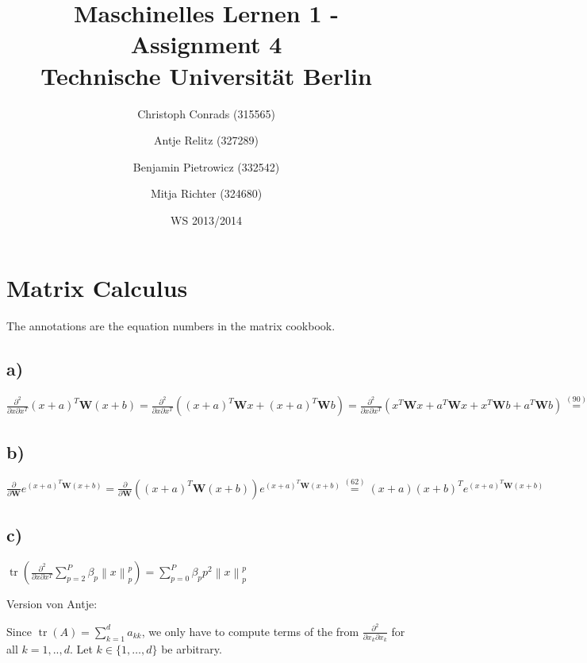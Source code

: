 \documentclass[paper=a4,fontsize=10pt,DIV11,BCOR10mm]{scrartcl}
\newcommand{\norm}[1]{\left\lVert#1\right\rVert}
\DeclareMathOperator{\tr}{tr}
\begin{document}
\title{Maschinelles Lernen 1 - Assignment 4\\
\small{Technische Universität Berlin}}


\author{\small{Christoph Conrads (315565)}\and \small{Antje Relitz (327289)}  \and \small{Benjamin Pietrowicz (332542)} \and \small{Mitja Richter (324680)} }

\date{WS 2013/2014}

\maketitle


\section{Matrix Calculus}
The annotations are the equation numbers in the matrix cookbook.

\subsection*{a)}
$ \frac{\partial^2}{\partial x \partial x^T}(x+a)^T \mathbf{W}(x+b) = \frac{\partial^2}{\partial x \partial x^T} ((x+a)^T \mathbf{W}x + (x+a)^T \mathbf{W}b) =  
\frac{\partial^2}{\partial x \partial x^T} (x^T\mathbf{W}x + a^T\mathbf{W}x + x^T\mathbf{W}b + a^T\mathbf{W}b) \stackrel{(90)}{=} \mathbf{W} + \mathbf{W}^T $

\subsection*{b)}

$ \frac{\partial}{\partial\mathbf{W}}e^{(x+a)^T\mathbf{W}(x+b)} = \frac{\partial}{\partial\mathbf{W}}((x+a)^T\mathbf{W}(x+b)) e^{(x+a)^T\mathbf{W}(x+b)} \stackrel{(62)}{=} (x+a)(x+b)^Te^{(x+a)^T\mathbf{W}(x+b)}$

\subsection*{c)}

$\tr(\frac{\partial^2}{\partial x\partial x^T} \sum_{p=2}^P \beta_p \norm{x}_p^p ) = 
\sum_{p=0}^P \beta_p p^2 \norm{x}_p^p$

Version von Antje:

Since $\tr(A)=\sum_{k=1}^d a_{kk}$, we only have to compute terms of the from $\frac{\partial^2}{\partial x_k\partial x_k}$ for all $k=1,..,d$. Let $k\in\{1,\dots,d\}$ be arbitrary.
\end{document}
